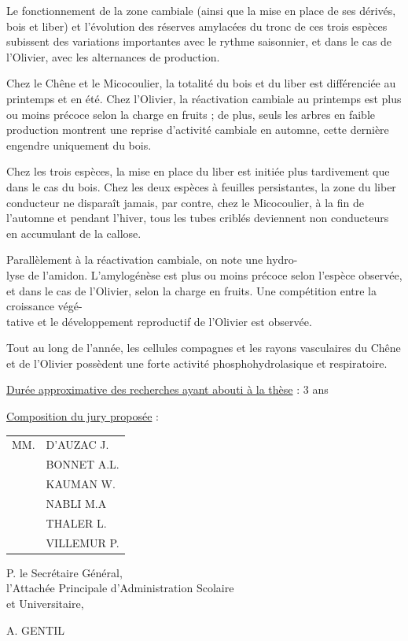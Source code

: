 Le fonctionnement de la zone cambiale (ainsi que la mise en place de ses dérivés, bois et liber) et l'évolution des réserves amylacées du tronc de ces trois espèces subissent des variations importantes avec le rythme saisonnier, et dans le cas de l'Olivier, avec les alternances de production.

Chez le Chêne et le Micocoulier, la totalité du bois et du liber est différenciée au printemps et en été. Chez l'Olivier, la réactivation cambiale au printemps est plus ou moins précoce selon la charge en fruits ; de plus, seuls les arbres en faible production montrent une reprise d'activité cambiale en automne, cette dernière engendre uniquement du bois.

Chez les trois espèces, la mise en place du liber est initiée plus tardivement que dans le cas du bois. Chez les deux espèces à feuilles persistantes, la zone du liber conducteur ne disparaît jamais, par contre, chez le Micocoulier, à la fin de l'automne et pendant l'hiver, tous les tubes criblés deviennent non conducteurs en accumulant de la callose.

Parallèlement à la réactivation cambiale, on note une hydro-\\
lyse de l'amidon. L'amylogénèse est plus ou moins précoce selon l'espèce observée, et dans le cas de l'Olivier, selon la charge en fruits. Une compétition entre la croissance végé-\\
tative et le développement reproductif de l'Olivier est observée.

Tout au long de l'année, les cellules compagnes et les rayons vasculaires du Chêne et de l'Olivier possèdent une forte activité phosphohydrolasique et respiratoire.

\uline{Durée approximative des recherches ayant abouti à la thèse} : 3 ans

\uline{Composition du jury proposée} :

\begin{tabular}{ll}
MM. & D'AUZAC J.\\
& BONNET A.L.\\
& KAUMAN W.\\
& NABLI M.A\\
& THALER L.\\
& VILLEMUR P.
\end{tabular}

\begin{center}
P. le Secrétaire Général,\\
l'Attachée Principale d'Administration Scolaire\\
et Universitaire,


A. GENTIL
\end{center}

